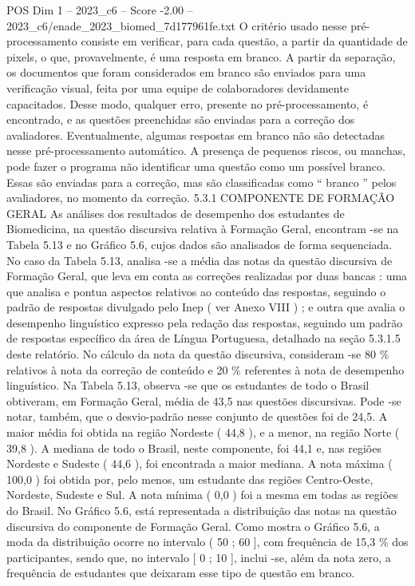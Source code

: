 \begin{textsample}{POS Dim 1 – 2023\_c6 – Score -2.00 – 2023\_c6/enade\_2023\_biomed\_7d177961fe.txt}
O critério usado nesse pré-processamento consiste em verificar, para cada questão, a partir da quantidade de pixels, o que, provavelmente, é uma resposta em branco.
A partir da separação, os documentos que foram considerados em branco são enviados para uma verificação visual, feita por uma equipe de colaboradores devidamente capacitados.
Desse modo, qualquer erro, presente no pré-processamento, é encontrado, e as questões preenchidas são enviadas para a correção dos avaliadores.
Eventualmente, algumas respostas em branco não são detectadas nesse pré-processamento automático.
A presença de pequenos riscos, ou manchas, pode fazer o programa não identificar uma questão como um possível branco.
Essas são enviadas para a correção, mas são classificadas como “ branco ” pelos avaliadores, no momento da correção. 5.3.1 COMPONENTE DE FORMAÇÃO GERAL As análises dos resultados de desempenho dos estudantes de Biomedicina, na questão discursiva relativa à Formação Geral, encontram -se na Tabela 5.13 e no Gráfico 5.6, cujos dados são analisados de forma sequenciada.
No caso da Tabela 5.13, analisa -se a média das notas da questão discursiva de Formação Geral, que leva em conta as correções realizadas por duas bancas : uma que analisa e pontua aspectos relativos ao conteúdo das respostas, seguindo o padrão de respostas divulgado pelo Inep ( ver Anexo VIII ) ; e outra que avalia o desempenho linguístico expresso pela redação das respostas, seguindo um padrão de respostas específico da área de Língua Portuguesa, detalhado na seção 5.3.1.5 deste relatório.
No cálculo da nota da questão discursiva, consideram -se 80 \% relativos à nota da correção de conteúdo e 20 \% referentes à nota de desempenho linguístico.
Na Tabela 5.13, observa -se que os estudantes de todo o Brasil obtiveram, em Formação Geral, média de 43,5 nas questões discursivas.
Pode -se notar, também, que o desvio-padrão nesse conjunto de questões foi de 24,5.
A maior média foi obtida na região Nordeste ( 44,8 ), e a menor, na região Norte ( 39,8 ).
A mediana de todo o Brasil, neste componente, foi 44,1 e, nas regiões Nordeste e Sudeste ( 44,6 ), foi encontrada a maior mediana.
A nota máxima ( 100,0 ) foi obtida por, pelo menos, um estudante das regiões Centro-Oeste, Nordeste, Sudeste e Sul.
A nota mínima ( 0,0 ) foi a mesma em todas as regiões do Brasil.
No Gráfico 5.6, está representada a distribuição das notas na questão discursiva do componente de Formação Geral.
Como mostra o Gráfico 5.6, a moda da distribuição ocorre no intervalo ( 50 ; 60 ], com frequência de 15,3 \% dos participantes, sendo que, no intervalo [ 0 ; 10 ], inclui -se, além da nota zero, a frequência de estudantes que deixaram esse tipo de questão em branco.

\end{textsample}
